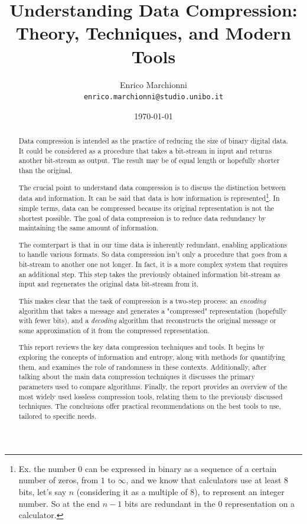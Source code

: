 \documentclass[12pt, a4paper]{report}
\title{
  Understanding Data Compression: Theory, Techniques, and Modern Tools
}
\author{
  Enrico Marchionni\\
  \texttt{enrico.marchionni@studio.unibo.it}
}
\date{\today}
\begin{document}
\maketitle

\begin{abstract}

Data compression is intended as the practice of reducing the size of binary digital data.
It could be considered as a procedure that takes a bit-stream in input and returns another bit-stream as output.
The result may be of equal length or hopefully shorter than the original.

The crucial point to understand data compression is to discuss the distinction between data and information.
It can be said that data is how information is represented\footnote{Ex. the number 0 can be expressed in binary as a sequence of a
certain number of zeros, from \(1\) to \(\infty\), and we know that calculators use at least 8 bits, let's say \(n\)
(considering it as a multiple of 8), to represent an integer number. So at the end \(n - 1\) bits are redundant in the 0
representation on a calculator.}.
In simple terms, data can be compressed because its original representation is not the shortest possible.
The goal of data compression is to reduce data redundancy by maintaining the same amount of information.

The counterpart is that in our time data is inherently redundant, enabling applications to handle various formats.
So data compression isn't only a procedure that goes from a bit-stream to another one not longer.
In fact, it is a more complex system that requires an additional step.
This step takes the previously obtained information bit-stream as input and regenerates the original data bit-stream from it.

This makes clear that the task of compression is a two-step process: an \textit{encoding} algorithm that takes a message
and generates a "compressed" representation (hopefully with fewer bits), and a \textit{decoding} algorithm that reconstructs
the original message or some approximation of it from the compressed representation.

This report reviews the key data compression techniques and tools.
It begins by exploring the concepts of information and entropy, along with methods for quantifying them, and examines the role of
randomness in these contexts.
Additionally, after talking about the main data compression techniques it discusses the primary parameters used to compare
algorithms.
Finally, the report provides an overview of the most widely used lossless compression tools, relating them to the previously
discussed techniques.
The conclusions offer practical recommendations on the best tools to use, tailored to specific needs.

\end{abstract}
\end{document}
